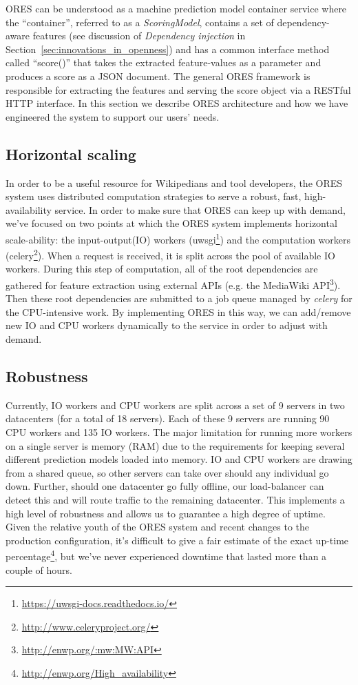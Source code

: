 
ORES can be understood as a machine prediction model container service where the ``container'', referred to as a \emph{ScoringModel}, contains a set of dependency-aware features (see discussion of \emph{Dependency injection} in Section~\ref{sec:innovations_in_openness}) and has a common interface method called ``score()'' that takes the extracted feature-values as a parameter and produces a score as a JSON document.  The general ORES framework is responsible for extracting the features and serving the score object via a RESTful HTTP interface.  In this section we describe ORES architecture and how we have engineered the system to support our users' needs.

\subsection{Horizontal scaling}
In order to be a useful resource for Wikipedians and tool developers, the ORES system uses distributed computation strategies to serve a robust, fast, high-availability service.   In order to make sure that ORES can keep up with demand, we've focused on  two points at which the ORES system implements horizontal scale-ability: the input-output(IO) workers (uwsgi\footnote{\url{https://uwsgi-docs.readthedocs.io/}}) and the computation workers (celery\footnote{\url{http://www.celeryproject.org/}}).  When a request is received, it is split across the pool of available IO workers.  During this step of computation, all of the root dependencies are gathered for feature extraction using external APIs (e.g. the MediaWiki API\footnote{\url{http://enwp.org/:mw:MW:API}}).  Then these root dependencies are submitted to a job queue managed by \emph{celery} for the CPU-intensive work.  By implementing ORES in this way, we can add/remove new IO and CPU workers dynamically to the service in order to adjust with demand.

\subsection{Robustness}
Currently, IO workers and CPU workers are split across a set of 9 servers in two datacenters (for a total of 18 servers).  Each of these 9 servers are running 90 CPU workers and 135 IO workers.  The major limitation for running more workers on a single server is memory (RAM) due to the requirements for keeping several different prediction models loaded into memory.  IO and CPU workers are drawing from a shared queue, so other servers can take over should any individual go down.  Further, should one datacenter go fully offline, our load-balancer can detect this and will route traffic to the remaining datacenter.  This implements a high level of robustness and allows us to guarantee a high degree of uptime.  Given the relative youth of the ORES system and recent changes to the production configuration, it's difficult to give a fair estimate of the exact up-time percentage\footnote{\url{http://enwp.org/High_availability}}, but we've never experienced downtime that lasted more than a couple of hours.

